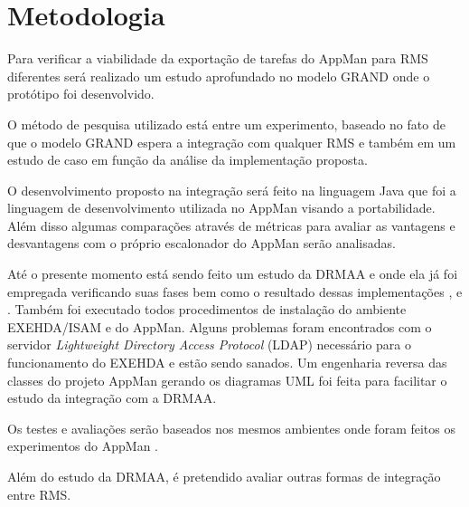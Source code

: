 \section{Metodologia}
\label{cap:metodologia}

Para verificar a viabilidade da exportação de tarefas do AppMan para RMS diferentes será realizado um estudo aprofundado no modelo GRAND onde o protótipo foi desenvolvido.

O método de pesquisa utilizado está entre um experimento, baseado no fato de que o modelo GRAND espera a integração com qualquer RMS e também em um estudo de caso em função da análise da implementação proposta.

O desenvolvimento proposto na integração será feito na linguagem Java que foi a linguagem de desenvolvimento utilizada no AppMan visando a portabilidade. Além disso algumas comparações através de métricas para avaliar as vantagens e desvantagens com o próprio escalonador do AppMan serão analisadas.

Até o presente momento está sendo feito um estudo da DRMAA e onde ela já foi empregada verificando suas fases bem como o resultado dessas implementações \cite{Templeton}, \cite{Llorente2005} e \cite{Haas2004}. Também foi executado todos procedimentos de instalação do ambiente EXEHDA/ISAM e do AppMan. Alguns problemas foram encontrados com o servidor \emph{ Lightweight Directory Access Protocol} (LDAP) necessário para o funcionamento do EXEHDA e estão sendo sanados. Um engenharia reversa das classes do projeto AppMan gerando os diagramas UML foi feita para facilitar o estudo da integração com a DRMAA.

Os testes e avaliações serão baseados nos mesmos ambientes onde foram feitos os experimentos do AppMan \cite{Mangan2006}. 

Além do estudo da DRMAA, é pretendido avaliar outras formas de integração entre RMS.
